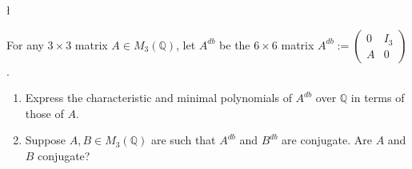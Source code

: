 \begin{exercise}
\l\label{2014:9}

\label{algebra:2014:9}For any $3 \times 3$ matrix $A \in M_3(\mathbb{Q})$, let $A^{db}$ be the $6 \times 6$ matrix $A^{db} := \begin{pmatrix} 0 & I_3 \\ A & 0 \end{pmatrix}$.
\begin{enumerate}
    \item Express the characteristic and minimal polynomials of $A^{db}$ over $\mathbb{Q}$ in terms of those of $A$.
    \item Suppose $A, B \in M_3(\mathbb{Q})$ are such that $A^{db}$ and $B^{db}$ are conjugate. Are $A$ and $B$ conjugate?
\end{enumerate}
\end{exercise}

